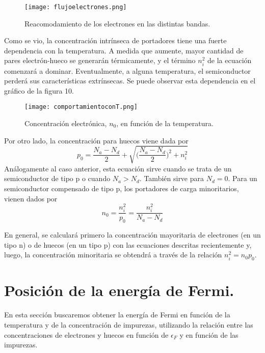 \documentclass[12pt,a4paper]{article}
\begin{document}
\begin{figure}[ht!]
\begin{center}
\texttt{[image: flujoelectrones.png]}
\caption{Reacomodamiento de los electrones en las distintas bandas.}
\end{center}
\end{figure}

Como se vio, la concentración intrínseca de portadores tiene una fuerte dependencia con la temperatura. A medida que aumente, mayor cantidad de pares electrón-hueco se generarán térmicamente, y el término $n_{i}^{2}$ de la ecuación comenzará a dominar. Eventualmente, a alguna temperatura, el semiconductor perderá sus características extrínsecas. Se puede observar esta dependencia en el gráfico de la figura 10.

\begin{figure}[ht!]
\begin{center}
\texttt{[image: comportamientoconT.png]}
\caption{Concentración electrónica, $n_{0}$, en función de la temperatura.}
\end{center}
\end{figure}

Por otro lado, la concentración para huecos viene dada por
\[ p_{0}= \frac{N_{a} - N_{d}}{2} + \sqrt{ \bigg( \frac{N_{a} - N_{d}}{2} \bigg)^{2} + n_{i}^{2}} \]
Análogamente al caso anterior, esta ecuación sirve cuando se trata de un semiconductor de tipo p o cuando $N_{a}>N_{d}$. También sirve para $N_{d}=0$. Para un semiconductor compensado de tipo p, los portadores de carga minoritarios, vienen dados por
\[ n_{0}=\frac{n_{i}^{2}}{p_{0}} = \frac{n_{i}^{2}}{N_{a} - N_{d}} \]

En general, se calculará primero la concentración mayoritaria de electrones (en un tipo n) o de huecos (en un tipo p) con las ecuaciones descritas recientemente y, luego, la concentración minoritaria se obtendrá a través de la relación $n_{i}^{2}=n_{0}p_{0}$.

\section{Posición de la energía de Fermi.}

En esta sección buscaremos obtener la energía de Fermi en función de la temperatura y de la concentración de impurezas, utilizando la relación entre las concentraciones de electrones y huecos en función de $\epsilon _{F}$ y en función de las impurezas.
\end{document}
